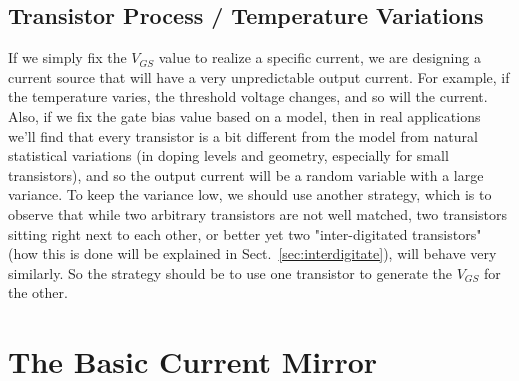\subsection{Transistor Process / Temperature Variations}
If we simply fix the $V_{GS}$ value to realize a specific current, we are designing a current source that will have a very unpredictable output current.  For example, if the temperature varies, the threshold voltage changes, and so will the current.  Also, if we fix the gate bias value based on a model, then in real applications we'll find that every transistor is a bit different from the model from natural statistical variations (in doping levels and geometry, especially for small transistors), and so the output current will be a random variable with a large variance.  To keep the variance low, we should use another strategy, which is to observe that while two arbitrary transistors are not well matched, two transistors sitting right next to each other, or better yet two "inter-digitated transistors" (how this is done will be explained in Sect.~\ref{sec:interdigitate}), will behave very similarly. So the strategy should be to use one transistor to generate the $V_{GS}$ for the other.
\newpage
\section{The Basic Current Mirror}

